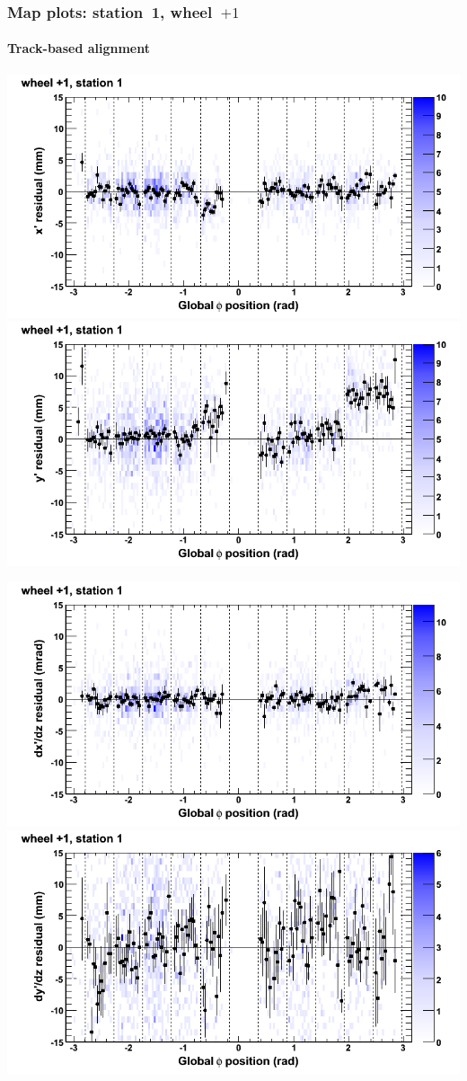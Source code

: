 \documentclass[compress]{beamer}
\begin{document}
\begin{frame}
\frametitle{Map plots: station~1, wheel~$+1$}
\framesubtitle{Track-based alignment}
\includegraphics[width=0.5\linewidth]{mapplots_re05/DTvsphi_st1whD_x.png}
\includegraphics[width=0.5\linewidth]{mapplots_re05/DTvsphi_st1whD_y.png}

\includegraphics[width=0.5\linewidth]{mapplots_re05/DTvsphi_st1whD_dxdz.png}
\includegraphics[width=0.5\linewidth]{mapplots_re05/DTvsphi_st1whD_dydz.png}
\end{frame}
\end{document}
